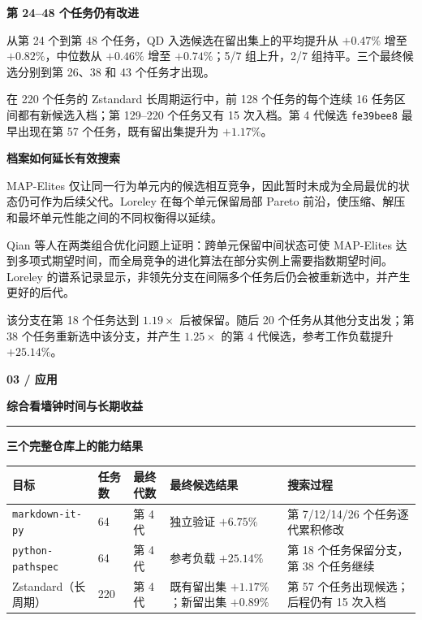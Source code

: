 \documentclass[UTF8,fontset=none,a4paper]{ctexart}
\newcommand{\pagetitle}[2]{%
  {\color{blue}\fontsize{11}{12}\selectfont\bfseries #1}\par
  {\color{ink}\fontsize{20}{22}\selectfont\bfseries #2}\vspace{3pt}\par
  {\color{line}\rule{\textwidth}{0.65pt}}\vspace{4pt}
}
\newcommand{\callout}[2]{%
  \colorbox{bluepale}{%
    \parbox{\dimexpr\linewidth-2\fboxsep\relax}{%
      \vspace{2pt}{\color{blue}\bfseries #1}\quad #2\vspace{2pt}%
    }%
  }%
}
\begin{document}
\vspace{5pt}

\begin{minipage}[t]{0.48\textwidth}
{\color{ink}\large\bfseries 第 24--48 个任务仍有改进}\par
\small
从第 24 个到第 48 个任务，QD 入选候选在留出集上的平均提升从 $+0.47\%$ 增至 $+0.82\%$，中位数从 $+0.46\%$ 增至 $+0.74\%$；5/7 组上升，2/7 组持平。三个最终候选分别到第 26、38 和 43 个任务才出现。\par
在 220 个任务的 Zstandard 长周期运行中，前 128 个任务的每个连续 16 任务区间都有新候选入档；第 129--220 个任务又有 15 次入档。第 4 代候选 \texttt{fe39bee8} 最早出现在第 57 个任务，既有留出集提升为 $+1.17\%$。
\end{minipage}\hfill
\begin{minipage}[t]{0.48\textwidth}
{\color{ink}\large\bfseries 档案如何延长有效搜索}\par
\small
MAP-Elites 仅让同一行为单元内的候选相互竞争，因此暂时未成为全局最优的状态仍可作为后续父代\citep{mouret2015mapelites}。Loreley 在每个单元保留局部 Pareto 前沿，使压缩、解压和最坏单元性能之间的不同权衡得以延续\citep{pierrot2022mome}。\par
Qian 等人在两类组合优化问题上证明：跨单元保留中间状态可使 MAP-Elites 达到多项式期望时间，而全局竞争的进化算法在部分实例上需要指数期望时间\citep{qian2024qdhelpful}。Loreley 的谱系记录显示，非领先分支在间隔多个任务后仍会被重新选中，并产生更好的后代。
\end{minipage}

\vspace{7pt}
\callout{Pathspec 谱系}{该分支在第 18 个任务达到 $1.19\times$ 后被保留。随后 20 个任务从其他分支出发；第 38 个任务重新选中该分支，并产生 $1.25\times$ 的第 4 代候选，参考工作负载提升 $+25.14\%$。}

\clearpage

\pagetitle{03 / 应用}{综合看墙钟时间与长期收益}

{\color{ink}\large\bfseries 三个完整仓库上的能力结果}\par
\small
\setlength{\tabcolsep}{5pt}
\renewcommand{\arraystretch}{1.18}
\begin{tabularx}{\textwidth}{@{}Y C{20mm} C{23mm} C{35mm} Y@{}}
\toprule
目标 & 任务数 & 最终代数 & 最终候选结果 & 搜索过程 \\
\midrule
\texttt{markdown-it-py} & 64 & 第 4 代 & 独立验证 $+6.75\%$ & 第 7/12/14/26 个任务逐代累积修改 \\
\texttt{python-pathspec} & 64 & 第 4 代 & 参考负载 $+25.14\%$ & 第 18 个任务保留分支，第 38 个任务继续 \\
Zstandard（长周期） & 220 & 第 4 代 & 既有留出集 $+1.17\%$；新留出集 $+0.89\%$ & 第 57 个任务出现候选；后程仍有 15 次入档 \\
\bottomrule
\end{tabularx}
\end{document}
